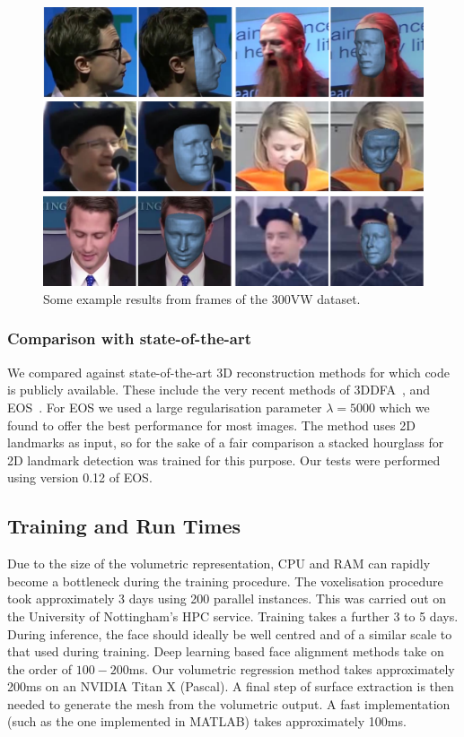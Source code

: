 \begin{figure}
  \centering
  \includegraphics[width=0.9\linewidth]{img/300vw.png}
  \caption[Visual results on the 300VW dataset]{Some example results
    from frames of the 300VW dataset.}
  \label{fig:face300vw}
\end{figure}


\subsubsection{Comparison with state-of-the-art}
We compared against state-of-the-art 3D reconstruction methods for
which code is publicly available. These include the very recent
methods of 3DDFA~\cite{zhu2016face}, and
EOS~\cite{huber2016multiresolution}. For EOS we used a large
regularisation parameter $\lambda = 5000$ which we found to offer the
best performance for most images. The method uses 2D landmarks as
input, so for the sake of a fair comparison a stacked hourglass for 2D
landmark detection was trained for this purpose. Our tests were
performed using version 0.12 of EOS.

\subsection{Training and Run Times}

Due to the size of the volumetric representation, CPU and RAM can
rapidly become a bottleneck during the training procedure. The
voxelisation procedure took approximately 3 days using 200 parallel
instances. This was carried out on the University of Nottingham's HPC
service. Training takes a further 3 to 5 days. During inference, the
face should ideally be well centred and of a similar scale to that
used during training. Deep learning based face alignment methods take
on the order of $100-200$ms. Our volumetric regression method takes
approximately 200ms on an NVIDIA Titan X (Pascal). A final step of
surface extraction is then needed to generate the mesh from the
volumetric output. A fast implementation (such as the one implemented
in MATLAB) takes approximately 100ms.

